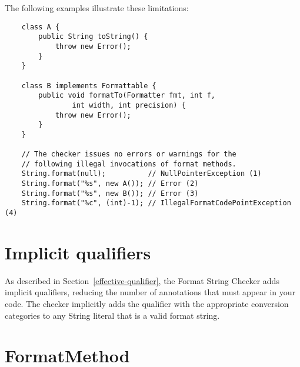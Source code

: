 \noindent The following examples illustrate these limitations:

\begin{Verbatim}
    class A {
        public String toString() {
            throw new Error();
        }
    }

    class B implements Formattable {
        public void formatTo(Formatter fmt, int f,
                int width, int precision) {
            throw new Error();
        }
    }

    // The checker issues no errors or warnings for the
    // following illegal invocations of format methods.
    String.format(null);          // NullPointerException (1)
    String.format("%s", new A()); // Error (2)
    String.format("%s", new B()); // Error (3)
    String.format("%c", (int)-1); // IllegalFormatCodePointException (4)
\end{Verbatim}

%
%


\section{Implicit qualifiers\label{formatter-implicit}}

As described in Section~\ref{effective-qualifier}, the Format String Checker adds implicit
qualifiers, reducing the number of annotations that must appear in your code.
The checker implicitly adds the  qualifier with the appropriate
conversion categories to any String literal that is a valid format string.


\section{FormatMethod}

